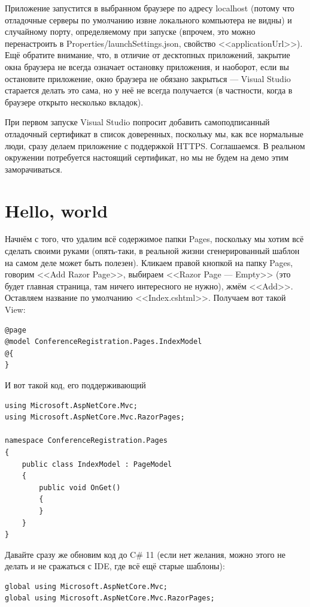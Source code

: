 \documentclass{../../text-style}
\begin{document}
Приложение запустится в выбранном браузере по адресу localhost (потому что отладочные серверы по умолчанию извне локального компьютера не видны) и случайному порту, определяемому при запуске (впрочем, это можно перенастроить в Properties/launchSettings.json, свойство <<applicationUrl>>). Ещё обратите внимание, что, в отличие от десктопных приложений, закрытие окна браузера не всегда означает остановку приложения, и наоборот, если вы остановите приложение, окно браузера не обязано закрыться --- Visual Studio старается делать это сама, но у неё не всегда получается (в частности, когда в браузере открыто несколько вкладок).

При первом запуске Visual Studio попросит добавить самоподписанный отладочный сертификат в список доверенных, поскольку мы, как все нормальные люди, сразу делаем приложение с поддержкой HTTPS. Соглашаемся. В реальном окружении потребуется настоящий сертификат, но мы не будем на демо этим заморачиваться.

\section{Hello, world}

Начнём с того, что удалим всё содержимое папки Pages, поскольку мы хотим всё сделать своими руками (опять-таки, в реальной жизни сгенерированный шаблон на самом деле может быть полезен). Кликаем правой кнопкой на папку Pages, говорим <<Add Razor Page>>, выбираем <<Razor Page --- Empty>> (это будет главная страница, там ничего интересного не нужно), жмём <<Add>>. Оставляем название по умолчанию <<Index.cshtml>>. Получаем вот такой View:

\begin{verbatim}
@page
@model ConferenceRegistration.Pages.IndexModel
@{
}
\end{verbatim}

И вот такой код, его поддерживающий

\begin{verbatim}
using Microsoft.AspNetCore.Mvc;
using Microsoft.AspNetCore.Mvc.RazorPages;

namespace ConferenceRegistration.Pages
{
    public class IndexModel : PageModel
    {
        public void OnGet()
        {
        }
    }
}
\end{verbatim}

Давайте сразу же обновим код до C\# 11 (если нет желания, можно этого не делать и не сражаться с IDE, где всё ещё старые шаблоны):

\begin{verbatim}
global using Microsoft.AspNetCore.Mvc;
global using Microsoft.AspNetCore.Mvc.RazorPages;
\end{verbatim}
\end{document}
